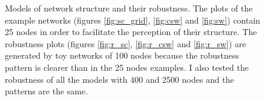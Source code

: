 \begin{landscape}
\begin{figure}[p]
\caption[Models of network structure and their robustness.]{Models of network structure and their robustness. The plots of the example networks (figures \ref{fig:sc_grid}, \ref{fig:csw} and \ref{fig:sw}) contain 25 nodes in order to facilitate the perception of their structure. The robustness plots (figures \ref{fig:r_sc}, \ref{fig:r_csw} and \ref{fig:r_sw}) are generated by toy networks of 100 nodes because the robustness pattern is clearer than in the 25 nodes examples. I also tested the robustness of all the models with 400 and 2500 nodes and the patterns are the same.}
\label{fig:models}
\end{figure}
\end{landscape}


